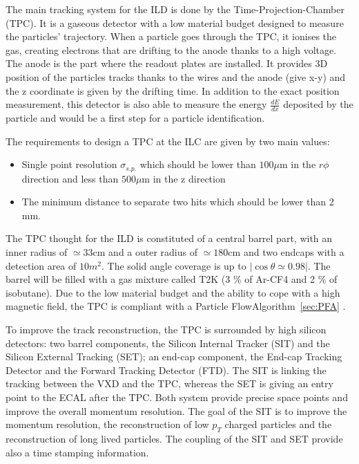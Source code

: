       The main tracking system for the \gls{ILD} is done by the Time-Projection-Chamber (TPC).
      It is a gaseous detector with a low material budget designed to measure the particles' trajectory.
      When a particle goes through the TPC, it ionises the gas, creating electrons that are drifting to the anode thanks to a high voltage.
      The anode is the part where the readout plates are installed.
      It provides 3D position of the particles tracks thanks to the wires and the anode (give x-y) and the z coordinate is given by the drifting time.
      In addition to the exact position measurement, this detector is also able to measure the energy $\frac{dE}{dx}$ deposited by the particle and would be a first step for a particle identification.

      The requirements to design a TPC at the ILC are given by two main values: 
      
      \begin{itemize} 
        \item Single point resolution $\sigma_{s.p.}$ which should be lower than $100 \mu\text{m}$ in the $r\phi$ direction and less than $500 \mu\text{m}$ in the z direction
        \item The minimum distance to separate two hits which should be lower than 2 mm.
      \end{itemize}

      The TPC thought for the \gls{ILD} is constituted of a central barrel part, with an inner radius of $\simeq 33 \text{cm}$ and a outer radius of $\simeq 180 \text{cm}$ and two endcaps with a detection area of $10 m^2$. 
      The solid angle coverage is up to $|\cos{\theta} \simeq 0.98|$.
      The barrel will be filled with a gas mixture called T2K (3 \% of Ar-CF4 and 2 \% of isobutane).
      Due to the low material budget and the ability to cope with a high magnetic field, the TPC is compliant with a Particle FlowAlgorithm~\ref{sec:PFA} . 


      To improve the track reconstruction, the TPC is surrounded by high silicon detectors: two barrel components, the Silicon Internal Tracker (SIT) and the Silicon External Tracking (SET); an end-cap component, the End-cap Tracking Detector and the Forward Tracking Detector (FTD).
      The SIT is linking the tracking between the VXD and the TPC, whereas the SET is giving an entry point to the ECAL after the TPC.
      Both system provide precise space points and improve the overall momentum resolution.
      The goal of the SIT is to improve the momentum resolution, the reconstruction of low $p_{T}$ charged particles and the reconstruction of long lived particles.
      The coupling of the SIT and SET provide also a time stamping information.

